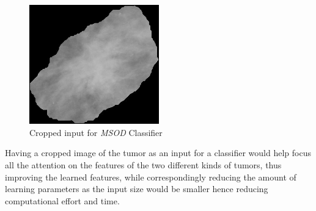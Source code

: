 \documentclass[12pt]{extarticle}
\begin{document}
	\begin{figure}[h]
		\centering
		\includegraphics[width=0.5\textwidth]{pics/Figures/cropped.jpg}
		\caption{\small{Cropped input for \emph{MSOD} Classifier}}
		\label{fig:cropped}
	\end{figure}
	Having a cropped image of the tumor as an input for a classifier would help focus all the attention on the features of the two different kinds of tumors, thus improving the learned features, while correspondingly reducing the amount of learning parameters as the input size would be smaller hence reducing computational effort and time. 
	
	
	
	
	
\end{document}
